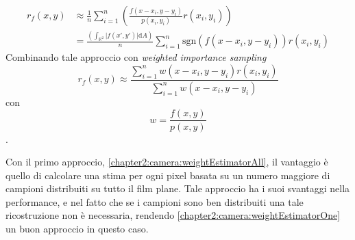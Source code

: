 \begin{align*}
	r_f(x,y) &\approx \frac{1}{n}\sum_{i=1}^n \left(\frac{f(x-x_i, y-y_i)}{p(x_i, y_i)} r(x_i, y_i)\right)\\
			&= \frac{\left(\displaystyle{\int_{\mathbb{R}^2}} \vert f(x',y')\vert \mathrm{d}A\right)}{n}
				\sum_{i=1}^n \mathrm{sgn}(f(x-x_i,y-y_i))r(x_i,y_i)
\end{align*}
Combinando tale approccio con \textit{weighted importance sampling}
\begin{equation}\label{chapter2:camera:weightEstimatorOne}
	r_f(x,y) \approx \frac{\sum_{i=1}^n w(x-x_i, y-y_i)r(x_i,y_i)}{\sum_{i=1}^n w(x-x_i, y-y_i)}
\end{equation}
con \[w=\frac{f(x,y)}{p(x,y)}\].\par
Con il primo approccio, \ref{chapter2:camera:weightEstimatorAll}, il vantaggio \`e quello di calcolare una stima per ogni pixel basata su un numero 
maggiore di campioni distribuiti su tutto il film plane. Tale approccio ha i suoi svantaggi nella performance, e nel fatto che se i campioni sono 
ben distribuiti una tale ricostruzione non \`e necessaria, rendendo \ref{chapter2:camera:weightEstimatorOne} un buon approccio in questo caso.
